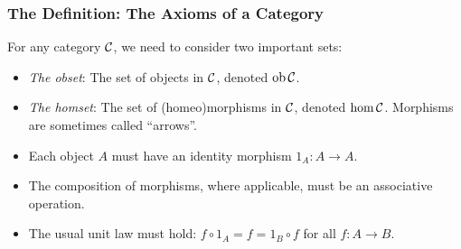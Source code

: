 \documentclass{beamer}
\numberwithin{figure}{section}
\begin{document}
\begin{frame}
        \frametitle{The Definition: The Axioms of a Category}
        For any category $\mathcal{C}$, we need to consider two important sets:
        \begin{itemize}
                \item \emph{The obset}: The set of objects in $\mathcal{C}$,
                        denoted $\operatorname{ob}{\mathcal{C}}$.
                \item \emph{The homset}: The set of (homeo)morphisms in
                        $\mathcal{C}$, denoted $\hom{\ensuremath\mathcal{C}}$. Morphisms
                        are sometimes called ``arrows''.
        \end{itemize}
        \begin{itemize}
                \item Each object $A$ must have an identity morphism $1_A \colon
                        A \to A$.
                \item The composition of morphisms, where applicable, must be an
                        associative operation.
                \item The usual unit law must hold: $f \circ 1_A = f = 1_B \circ
                        f$ for all $f \colon A \to B$.
        \end{itemize}
\end{frame}
\end{document}
